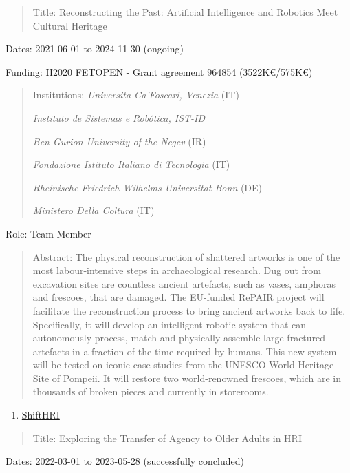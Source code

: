 \documentclass[
]{article}
\begin{document}
\begin{quote}
Title: Reconstructing the Past: Artificial Intelligence and Robotics
Meet Cultural Heritage
\end{quote}

Dates: 2021-06-01 to 2024-11-30 (ongoing)

Funding: H2020 FETOPEN - Grant agreement 964854 (3522K€/575K€)

\begin{quote}
Institutions: \emph{Universita Ca'Foscari, Venezia} (IT)

\emph{Instituto de Sistemas e Robótica, IST-ID}

\emph{Ben-Gurion University of the Negev} (IR)

\emph{Fondazione Istituto Italiano di Tecnologia} (IT)

\emph{Rheinische Friedrich-Wilhelms-Universitat Bonn} (DE)

\emph{Ministero Della Coltura} (IT)
\end{quote}

Role: Team Member

\begin{quote}
Abstract: The physical reconstruction of shattered artworks is one of
the most labour-intensive steps in archaeological research. Dug out from
excavation sites are countless ancient artefacts, such as vases,
amphoras and frescoes, that are damaged. The EU-funded RePAIR project
will facilitate the reconstruction process to bring ancient artworks
back to life. Specifically, it will develop an intelligent robotic
system that can autonomously process, match and physically assemble
large fractured artefacts in a fraction of the time required by humans.
This new system will be tested on iconic case studies from the UNESCO
World Heritage Site of Pompeii. It will restore two world-renowned
frescoes, which are in thousands of broken pieces and currently in
storerooms.
\end{quote}

\begin{enumerate}
\def\labelenumi{\arabic{enumi}.}
\setcounter{enumi}{1}
\item
  \ul{ShiftHRI}
\end{enumerate}

\begin{quote}
Title: Exploring the Transfer of Agency to Older Adults in HRI
\end{quote}

Dates: 2022-03-01 to 2023-05-28 (successfully concluded)
\end{document}
